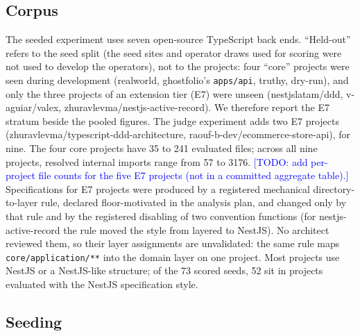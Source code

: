 \documentclass[10pt,a4paper]{article}
\newcommand{\todo}[1]{\textcolor{blue}{[TODO: #1]}}
\begin{document}
\subsection{Corpus}

The seeded experiment uses seven open-source TypeScript back ends. ``Held-out'' refers to the seed split (the seed
sites and operator draws used for scoring were not used to develop the operators), not to the projects: four
``core'' projects were seen during development (realworld, ghostfolio's \texttt{apps/api}, truthy, dry-run), and
only the three projects of an extension tier (E7) were unseen (nestjslatam/ddd, v-aguiar/valex,
zhuravlevma/nestjs-active-record). We therefore report the E7 stratum beside the pooled figures. The judge experiment
adds two E7 projects (zhuravlevma/typescript-ddd-architecture, raouf-b-dev/ecommerce-store-api), for nine.
The four core projects have 35 to 241 evaluated files; across all nine projects, resolved internal imports range
from 57 to 3176. %
\todo{add per-project file counts for the five E7 projects (not in a committed aggregate table).}
Specifications for E7 projects were produced by a registered mechanical directory-to-layer rule, declared
floor-motivated in the analysis plan, and changed only by that rule and by the registered disabling of two
convention functions (for nestjs-active-record the rule moved the style from layered to NestJS). No architect
reviewed them, so their layer assignments are unvalidated: the same rule maps \texttt{core/application/**} into the
domain layer on one project.
Most projects use NestJS or a NestJS-like structure; of the 73 scored seeds, 52 sit in projects evaluated with the
NestJS specification style. %

\subsection{Seeding}
\end{document}
